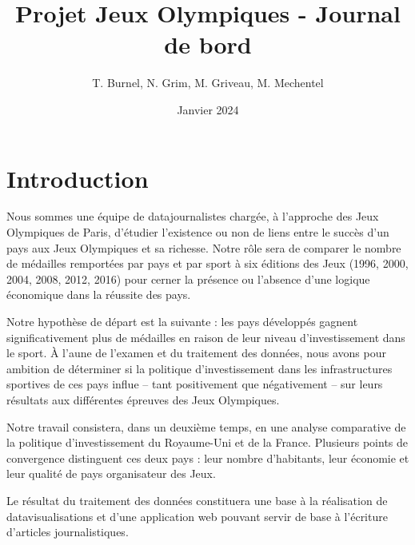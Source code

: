\documentclass[hidelinks, 12pt]{article}
\title{Projet Jeux Olympiques - Journal de bord}
\date{Janvier 2024}
\author{T. Burnel, N. Grim, M. Griveau, M. Mechentel}
\begin{document}
\maketitle





















\section{Introduction}

Nous sommes une équipe de datajournalistes chargée, à l'approche des Jeux Olympiques de Paris, d'étudier l'existence ou non de liens entre le succès d'un pays aux Jeux Olympiques et sa richesse. Notre rôle sera de comparer le nombre de médailles remportées par pays et par sport à six éditions des Jeux (1996, 2000, 2004, 2008, 2012, 2016) pour cerner la présence ou l'absence d'une logique économique dans la réussite des pays.

Notre hypothèse de départ est la suivante : les pays développés gagnent significativement plus de médailles en raison de leur niveau d'investissement dans le sport. À l’aune de l’examen et du traitement des données, nous avons pour ambition de déterminer si la politique d’investissement dans les infrastructures sportives de ces pays influe -- tant positivement que négativement -- sur leurs résultats aux différentes épreuves des Jeux Olympiques.

Notre travail consistera, dans un deuxième temps, en une analyse comparative de la politique d'investissement du Royaume-Uni et de la France. Plusieurs points de convergence distinguent ces deux pays : leur nombre d'habitants, leur économie et leur qualité de pays organisateur des Jeux.
	
Le résultat du traitement des données constituera une base à la réalisation de datavisualisations et d'une application web pouvant servir de base à l'écriture d'articles journalistiques.
\end{document}
